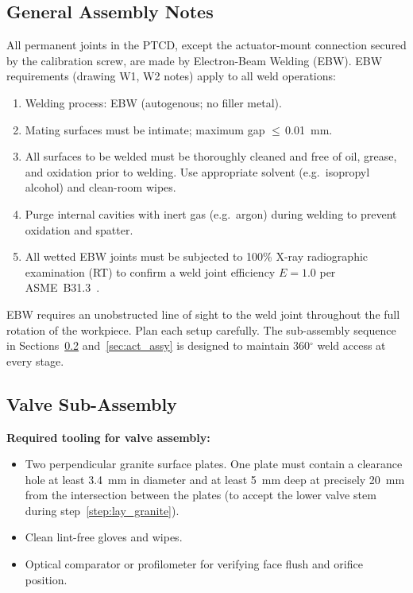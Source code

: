 \documentclass[12pt, letterpaper]{report}%
\newcounter{mycounter}           %
\newcounter{sub}[mycounter]      %
\begin{document}
\subsection{General Assembly Notes}

All permanent joints in the PTCD, except the actuator-mount connection
secured by the calibration screw,
are made by Electron-Beam Welding (EBW).
EBW requirements (drawing W1, W2 notes) apply to all weld operations:

\begin{enumerate}[itemsep=3pt]
	\item Welding process: EBW (autogenous; no filler metal).
	\item Mating surfaces must be intimate; maximum gap $\leq$\,\SI{0.01}{\milli\meter}.
	\item All surfaces to be welded must be thoroughly cleaned and free of oil, grease,
				and oxidation prior to welding. Use appropriate solvent (e.g.\ isopropyl
				alcohol) and clean-room wipes.
	\item Purge internal cavities with inert gas (e.g.\ argon) during welding to
				prevent oxidation and spatter.
	\item All wetted EBW joints must be subjected to 100\% X-ray radiographic
				examination (RT) to confirm a weld joint efficiency $E = 1.0$ per
				ASME~B31.3~\cite{ref_asme_b313}.
\end{enumerate}

EBW requires an unobstructed line of sight to the weld joint throughout the
full rotation of the workpiece. Plan each setup carefully. The sub-assembly
sequence in Sections~\ref{sec:valve_assy} and~\ref{sec:act_assy} is designed
to maintain 360$^{\circ}$ weld access at every stage.

\subsection{Valve Sub-Assembly}
\label{sec:valve_assy}

\begin{notebox}
\textbf{Required tooling for valve assembly:}
\begin{itemize}[itemsep=2pt]
	\item Two perpendicular granite surface plates. One plate must contain a clearance
				hole at least \SI{3.4}{\milli\meter} in diameter and at least \SI{5}{\milli\meter}
				deep at precisely \SI{20}{\milli\meter} from the intersection between the plates
				(to accept the lower valve stem during
				step~\ref{step:lay_granite}).
	\item Clean lint-free gloves and wipes.
	\item Optical comparator or profilometer for verifying face flush and orifice position.
\end{itemize}
\end{notebox}
\end{document}
